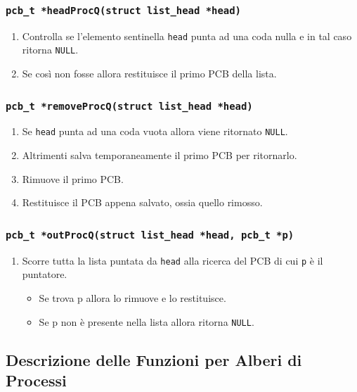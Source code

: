 \documentclass[a4paper,12pt]{article}
\begin{document}
\subsubsection{\texttt{pcb\_t *headProcQ(struct list\_head *head)}}
\begin{enumerate}
    \item Controlla se l'elemento sentinella \texttt{head} punta ad una coda nulla e in tal caso ritorna \texttt{NULL}.
    \item Se così non fosse allora restituisce il primo PCB della lista.
\end{enumerate}

\subsubsection{\texttt{pcb\_t *removeProcQ(struct list\_head *head)}}
\begin{enumerate}
    \item Se \texttt{head} punta ad una coda vuota allora viene ritornato \texttt{NULL}.
    \item Altrimenti salva temporaneamente il primo PCB per ritornarlo.
    \item Rimuove il primo PCB.
    \item Restituisce il PCB appena salvato, ossia quello rimosso. 
\end{enumerate}

\subsubsection{\texttt{pcb\_t *outProcQ(struct list\_head *head, pcb\_t *p)}}
\begin{enumerate}
    \item Scorre tutta la lista puntata da \texttt{head} alla ricerca del PCB di cui \texttt{p} è il puntatore.
    \begin{itemize}
        \item Se trova p allora lo rimuove e lo restituisce.
        \item Se p non è presente nella lista allora ritorna \texttt{NULL}.
    \end{itemize}
\end{enumerate}


\vspace{0.5cm}
\subsection{Descrizione delle Funzioni per Alberi di Processi}
\end{document}
